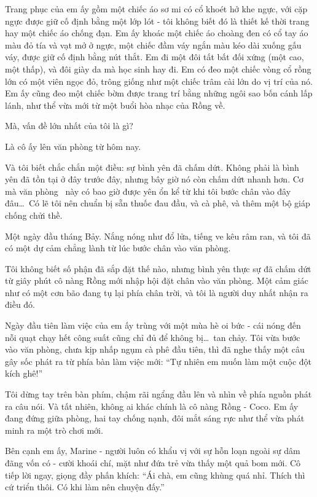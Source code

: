 \documentclass[../main.tex]{subfiles}
\begin{document}
Trang phục của em ấy gồm một chiếc áo sơ mi có cổ khoét hở khe ngực, với cặp ngực được giữ cố định bằng một lớp lót - tôi không biết đó là thiết kế thời trang hay một chiếc áo chống đạn. Em ấy khoác một chiếc áo choàng đen có cổ tay áo màu đỏ tía và vạt mở ở ngực, một chiếc đầm váy ngắn màu kéo dài xuống gấu váy, được giữ cố định bằng nút thắt. Em đi một đôi tất bất đối xứng (một cao, một thấp), và đôi giày da mà học sinh hay đi. Em có đeo một chiếc vòng cổ rồng lớn có một viên ngọc đỏ, trông giống như một chiếc trâm cài lớn do vị trí của nó. Em ấy cũng đeo một chiếc bờm được trang trí bằng những ngôi sao bốn cánh lấp lánh, như thể vừa mới từ một buổi hòa nhạc của Rồng về.

\chrint

Mà, vấn đề lớn nhất của tôi là gì?

Là cô ấy lên văn phòng từ hôm nay.

Và tôi biết chắc chắn một điều: sự bình yên đã chấm dứt. Không phải là bình yên đã tồn tại ở đây trước đây, nhưng bây giờ nó còn chấm dứt nhanh hơn. Cơ mà văn phòng \hll\ này có bao giờ được yên ổn kể từ khi tôi bước chân vào đây đâu\dots\ Có lẽ tôi nên chuẩn bị sẵn thuốc đau đầu, và cà phê, và thêm một bộ giáp chống chửi thề.

\il

Một ngày đầu tháng Bảy. Nắng nóng như đổ lửa, tiếng ve kêu râm ran, và tôi đã có một dự cảm chẳng lành từ lúc bước chân vào văn phòng.

Tôi không biết số phận đã sắp đặt thế nào, nhưng bình yên thực sự đã chấm dứt từ giây phút cô nàng Rồng mới nhập hội đặt chân vào văn phòng. Một cảm giác như có một cơn bão đang tụ lại phía chân trời, và tôi là người duy nhất nhận ra điều đó.

Ngày đầu tiên làm việc của em ấy trùng với một mùa hè oi bức - cái nóng đến nỗi quạt chạy hết công suất cũng chỉ đủ để không bị\dots\ tan chảy. Tôi vừa bước vào văn phòng, chưa kịp nhấp ngụm cà phê đầu tiên, thì đã nghe thấy một câu gây sốc phát ra từ phía bàn làm việc mới: ``Tự nhiên em muốn làm một cuộc đột kích ghê!''

Tôi dừng tay trên bàn phím, chậm rãi ngẩng đầu lên và nhìn về phía nguồn phát ra câu nói. Và tất nhiên, không ai khác chính là cô nàng Rồng - Coco. Em ấy đang đứng giữa phòng, hai tay chống nạnh, đôi mắt sáng rực như thể vừa phát minh ra một trò chơi mới.

Bên cạnh em ấy, Marine - người luôn có khẩu vị với sự hỗn loạn ngoài sự dâm đãng vốn có - cười khoái chí, mặt như đứa trẻ vừa thấy một quả bom mới. Cô tiếp lời ngay, giọng đầy phấn khích: ``Ái chà, em cũng khùng quá nhỉ. Thích thì cứ triển thôi. Có khi làm nên chuyện đấy.''
\end{document}
